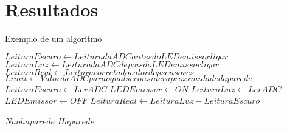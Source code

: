 \chapter[Resultados]{Resultados}
\label{Ch:Resultados}

Exemplo de um algorítmo
\begin{algorithmic}[1]
\State $LeituraEscuro \gets Leitura da ADC antes do LED emissor ligar$
	\State $LeituraLuz \gets Leitura da ADC depois do LED emissor ligar$ 
    \State $LeituraReal \gets Leitura correta do valor dos sensores$ 
    \State $Limit \gets Valorda ADC para o qual se considera proximidade da parede$ 
\Repeat
\State $LeituraEscuro \gets LerADC$
\State $LEDEmissor \gets ON$
\State $LeituraLuz \gets LerADC$
\State $LEDEmissor \gets OFF$
\State $LeituraReal \gets LeituraLuz - LeituraEscuro$

    \State \Return $Nao ha parede$
  \Else
    \State \Return $Ha parede$
  \EndIf


\end{algorithmic}





